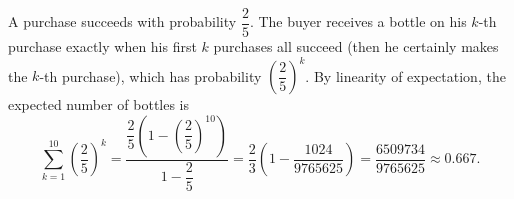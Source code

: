 A purchase succeeds with probability $\dfrac25$. The buyer receives a bottle on his $k$-th purchase exactly when his first $k$ purchases all succeed (then he certainly makes the $k$-th purchase), which has probability $\left(\dfrac25\right)^k$. By linearity of expectation, the expected number of bottles is
\[\sum_{k=1}^{10}\left(\dfrac25\right)^k=\dfrac{\dfrac25\left(1-\left(\dfrac25\right)^{10}\right)}{1-\dfrac25}=\dfrac23\left(1-\dfrac{1024}{9765625}\right)=\boxed{\dfrac{6509734}{9765625}}\approx0.667.\]
